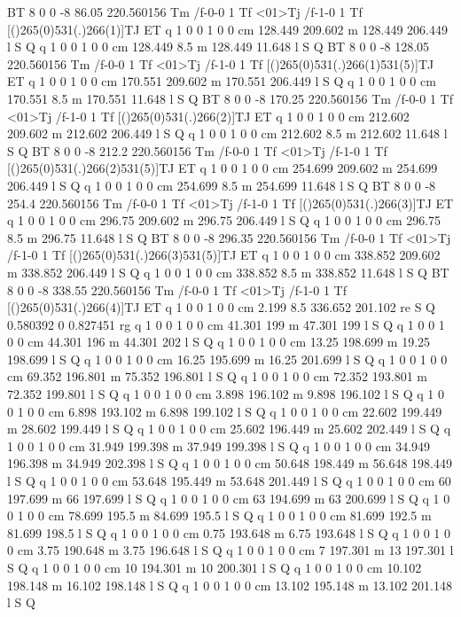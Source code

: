 BT
8 0 0 -8 86.05 220.560156 Tm
/f-0-0 1 Tf
<01>Tj
/f-1-0 1 Tf
[()265(0)531(.)266(1)]TJ
ET
q 1 0 0 1 0 0 cm
128.449 209.602 m 128.449 206.449 l S Q
q 1 0 0 1 0 0 cm
128.449 8.5 m 128.449 11.648 l S Q
BT
8 0 0 -8 128.05 220.560156 Tm
/f-0-0 1 Tf
<01>Tj
/f-1-0 1 Tf
[()265(0)531(.)266(1)531(5)]TJ
ET
q 1 0 0 1 0 0 cm
170.551 209.602 m 170.551 206.449 l S Q
q 1 0 0 1 0 0 cm
170.551 8.5 m 170.551 11.648 l S Q
BT
8 0 0 -8 170.25 220.560156 Tm
/f-0-0 1 Tf
<01>Tj
/f-1-0 1 Tf
[()265(0)531(.)266(2)]TJ
ET
q 1 0 0 1 0 0 cm
212.602 209.602 m 212.602 206.449 l S Q
q 1 0 0 1 0 0 cm
212.602 8.5 m 212.602 11.648 l S Q
BT
8 0 0 -8 212.2 220.560156 Tm
/f-0-0 1 Tf
<01>Tj
/f-1-0 1 Tf
[()265(0)531(.)266(2)531(5)]TJ
ET
q 1 0 0 1 0 0 cm
254.699 209.602 m 254.699 206.449 l S Q
q 1 0 0 1 0 0 cm
254.699 8.5 m 254.699 11.648 l S Q
BT
8 0 0 -8 254.4 220.560156 Tm
/f-0-0 1 Tf
<01>Tj
/f-1-0 1 Tf
[()265(0)531(.)266(3)]TJ
ET
q 1 0 0 1 0 0 cm
296.75 209.602 m 296.75 206.449 l S Q
q 1 0 0 1 0 0 cm
296.75 8.5 m 296.75 11.648 l S Q
BT
8 0 0 -8 296.35 220.560156 Tm
/f-0-0 1 Tf
<01>Tj
/f-1-0 1 Tf
[()265(0)531(.)266(3)531(5)]TJ
ET
q 1 0 0 1 0 0 cm
338.852 209.602 m 338.852 206.449 l S Q
q 1 0 0 1 0 0 cm
338.852 8.5 m 338.852 11.648 l S Q
BT
8 0 0 -8 338.55 220.560156 Tm
/f-0-0 1 Tf
<01>Tj
/f-1-0 1 Tf
[()265(0)531(.)266(4)]TJ
ET
q 1 0 0 1 0 0 cm
2.199 8.5 336.652 201.102 re S Q
0.580392 0 0.827451 rg
q 1 0 0 1 0 0 cm
41.301 199 m 47.301 199 l S Q
q 1 0 0 1 0 0 cm
44.301 196 m 44.301 202 l S Q
q 1 0 0 1 0 0 cm
13.25 198.699 m 19.25 198.699 l S Q
q 1 0 0 1 0 0 cm
16.25 195.699 m 16.25 201.699 l S Q
q 1 0 0 1 0 0 cm
69.352 196.801 m 75.352 196.801 l S Q
q 1 0 0 1 0 0 cm
72.352 193.801 m 72.352 199.801 l S Q
q 1 0 0 1 0 0 cm
3.898 196.102 m 9.898 196.102 l S Q
q 1 0 0 1 0 0 cm
6.898 193.102 m 6.898 199.102 l S Q
q 1 0 0 1 0 0 cm
22.602 199.449 m 28.602 199.449 l S Q
q 1 0 0 1 0 0 cm
25.602 196.449 m 25.602 202.449 l S Q
q 1 0 0 1 0 0 cm
31.949 199.398 m 37.949 199.398 l S Q
q 1 0 0 1 0 0 cm
34.949 196.398 m 34.949 202.398 l S Q
q 1 0 0 1 0 0 cm
50.648 198.449 m 56.648 198.449 l S Q
q 1 0 0 1 0 0 cm
53.648 195.449 m 53.648 201.449 l S Q
q 1 0 0 1 0 0 cm
60 197.699 m 66 197.699 l S Q
q 1 0 0 1 0 0 cm
63 194.699 m 63 200.699 l S Q
q 1 0 0 1 0 0 cm
78.699 195.5 m 84.699 195.5 l S Q
q 1 0 0 1 0 0 cm
81.699 192.5 m 81.699 198.5 l S Q
q 1 0 0 1 0 0 cm
0.75 193.648 m 6.75 193.648 l S Q
q 1 0 0 1 0 0 cm
3.75 190.648 m 3.75 196.648 l S Q
q 1 0 0 1 0 0 cm
7 197.301 m 13 197.301 l S Q
q 1 0 0 1 0 0 cm
10 194.301 m 10 200.301 l S Q
q 1 0 0 1 0 0 cm
10.102 198.148 m 16.102 198.148 l S Q
q 1 0 0 1 0 0 cm
13.102 195.148 m 13.102 201.148 l S Q
